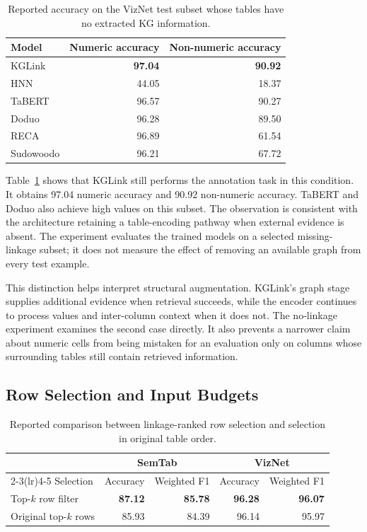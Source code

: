 \begin{table}[tbp]
\centering
\caption{Reported accuracy on the VizNet test subset whose tables have no extracted KG information.}
\label{tab:kglink:no-kg}
\begin{tabular}{lrr}
\toprule
Model&Numeric accuracy&Non-numeric accuracy\\
\midrule
KGLink&\textbf{97.04}&\textbf{90.92}\\
HNN&44.05&18.37\\
TaBERT&96.57&90.27\\
Doduo&96.28&89.50\\
RECA&96.89&61.54\\
Sudowoodo&96.21&67.72\\
\bottomrule
\end{tabular}
\end{table}

Table~\ref{tab:kglink:no-kg} shows that KGLink still performs the annotation task in this condition. It obtains 97.04 numeric accuracy and 90.92 non-numeric accuracy. TaBERT and Doduo also achieve high values on this subset. The observation is consistent with the architecture retaining a table-encoding pathway when external evidence is absent. The experiment evaluates the trained models on a selected missing-linkage subset; it does not measure the effect of removing an available graph from every test example.

This distinction helps interpret structural augmentation. KGLink's graph stage supplies additional evidence when retrieval succeeds, while the encoder continues to process values and inter-column context when it does not. The no-linkage experiment examines the second case directly. It also prevents a narrower claim about numeric cells from being mistaken for an evaluation only on columns whose surrounding tables still contain retrieved information.

\subsection{Row Selection and Input Budgets}
\label{sec:kglink:row-evaluation}

\begin{table}[tbp]
\centering
\caption{Reported comparison between linkage-ranked row selection and selection in original table order.}
\label{tab:kglink:row-filter}
\begin{tabular}{lrrrr}
\toprule
&\multicolumn{2}{c}{SemTab}&\multicolumn{2}{c}{VizNet}\\
\cmidrule(lr){2-3}\cmidrule(lr){4-5}
Selection&Accuracy&Weighted F1&Accuracy&Weighted F1\\
\midrule
Top-$k$ row filter&\textbf{87.12}&\textbf{85.78}&\textbf{96.28}&\textbf{96.07}\\
Original top-$k$ rows&85.93&84.39&96.14&95.97\\
\bottomrule
\end{tabular}
\end{table}

